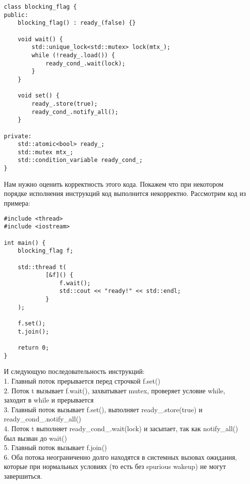 \documentclass{article}
\begin{document}
\begin{lstlisting}
class blocking_flag {
public:
	blocking_flag() : ready_(false) {}

	void wait() {
		std::unique_lock<std::mutex> lock(mtx_);
		while (!ready_.load()) {
			ready_cond_.wait(lock);
		}
	}

	void set() {
		ready_.store(true);
		ready_cond_.notify_all();
	}

private:
	std::atomic<bool> ready_;
	std::mutex mtx_;
	std::condition_variable ready_cond_;
}
\end{lstlisting}

Нам нужно оценить корректность этого кода. 
Покажем что при некотором порядке исполнения инструкций код выполнится некорректно.
Рассмотрим код из примера:

\begin{lstlisting}
#include <thread>   
#include <iostream>   

int main() {
	blocking_flag f;

	std::thread t(
			[&f]() {
				f.wait();
				std::cout << "ready!" << std::endl;
			}
	);

	f.set();
	t.join();

	return 0;
}
\end{lstlisting}

И следующую последовательность инструкций:\\
1. Главный поток прерывается перед строчкой f.set()\\
2. Поток t вызывает f.wait(), захватывает mutex, проверяет условие while, заходит в while и прерывается\\
3. Главный поток вызывает f.set(), выполняет ready\_.store(true) и ready\_cond\_.notify\_all()\\
4. Поток t выполняет ready\_cond\_.wait(lock) и засыпает, так как notify\_all() был вызван до wait()\\
5. Главный поток вызывает f.join()\\
6. Оба потока неограниченно долго находятся в системных вызовах ожидания, которые при нормальных условиях (то есть без spurious wakeup) не могут завершиться.
\end{document}
